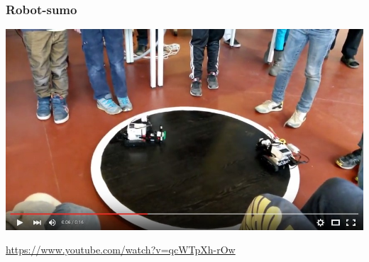 \documentclass{beamer}
\begin{document}






\begin{frame}
  \frametitle{Robot-sumo}
  \includegraphics[width=\textwidth]{imagery/robotsumo}
  
  \url{https://www.youtube.com/watch?v=qcWTpXh-rOw}
\end{frame}

  
\end{document}
